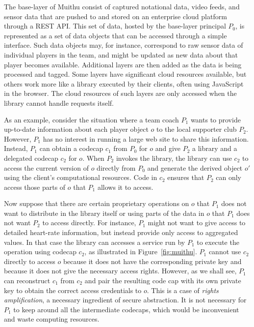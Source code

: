 \documentclass[10pt, conference, compsocconf]{IEEEtran}
\begin{document}
The base-layer of Muithu consist of captured notational data, video
feeds, and sensor data that are pushed to and stored on an enterprise
cloud platform through a REST API.  This set of data, hosted by the
base-layer principal $P_0$, is represented as a set of data objects that
can be accessed through a simple interface.  Such data objects may, for
instance, correspond to raw sensor data of individual players in the team,
and might be updated as new data about that player becomes available.
Additional layers are then added as the data is being processed and
tagged.  Some layers have significant cloud resources available, but
others work more like a library executed by their clients, often using
JavaScript in the browser.  The cloud resources of such layers are
only accessed when the library cannot handle requests itself.

As an example, consider the situation where a team coach $P_1$ wants to
provide up-to-date information about each player object $o$ to the local
supporter club $P_2$.  However, $P_1$ has no interest in running a large
web site to share this information.  Instead, $P_1$ can obtain a codecap
$c_1$ from $P_0$ for $o$ and give $P_2$ a library and a delegated codecap
$c_2$ for $o$.  When $P_2$ invokes the library, the library can use $c_2$
to access the current version of $o$ directly from $P_0$ and generate
the derived object $o'$ using the client's computational resources. 
Code in $c_2$ ensures that $P_2$ can only access those parts of $o$ that
$P_1$ allows it to access.


Now suppose that there are certain proprietary operations on $o$ that
$P_1$ does not want to distribute in the library itself or using parts
of the data in $o$ that $P_1$ does not want $P_2$ to access directly.
For instance, $P_1$ might not want to give access to detailed heart-rate
information, but instead provide only access to aggregated values.
In that case the library can accesses a service run by $P_1$ to execute
the operation using codecap $c_2$, as illustrated in Figure~\ref{fig:muithu}.
  $P_1$ cannot use $c_2$ directly
to access $o$ because it does not have the corresponding private key
and because it does not give the necessary access rights.  However,
as we shall see, $P_1$ can reconstruct $c_1$ from $c_2$ and pair the
resulting code cap with its own private key to obtain the correct access
credentials to $o$.  This is a case of \emph{rights amplification},
a necessary ingredient of secure abstraction.  It is not necessary
for $P_1$ to keep around all the intermediate codecaps, which would be
inconvenient and waste computing resources.
\end{document}
